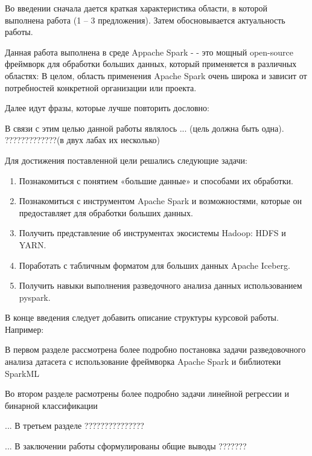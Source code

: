 %
Во введении сначала дается краткая характеристика области, в которой выполнена работа (1 -- 3 предложения). Затем обосновывается актуальность работы.

Данная работа выполнена в среде Appache Spark - - это мощный open-source фреймворк для обработки больших данных, который применяется в различных областях:
В целом, область применения Apache Spark очень широка и зависит от потребностей конкретной организации или проекта.

Далее идут фразы, которые лучше повторить дословно:

В связи с этим целью данной работы являлось ... (цель должна быть одна). ?????????????(в двух лабах их несколько)

Для достижения поставленной цели решались следующие задачи:
\begin{enumerate}
\item Познакомиться с понятием «большие данные» и способами их обработки.
\item Познакомиться с инструментом Apache Spark и возможностями, которые он предоставляет для обработки больших данных.
\item Получить представление об инструментах экосистемы Hadoop: HDFS и YARN.
\item Поработать с табличным форматом для больших данных Apache Iceberg.
\item Получить навыки выполнения разведочного анализа данных использованием pyspark.
\end{enumerate}


В конце введения следует добавить описание структуры курсовой работы. Например:
\par В первом разделе рассмотрена более подробно постановка задачи разведовочного анализа датасета с использование фреймворка Apache Spark и библиотеки SparkML
\par Во втором разделе расмотрены более подробно задачи линейной регрессии и бинарной классификации
\par... В третьем разделе ???????????????
\par ... В заключении работы сформулированы общие выводы ???????